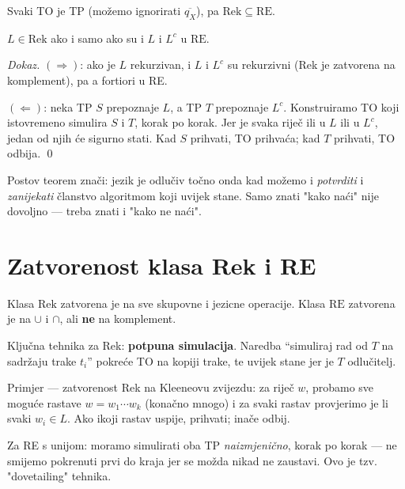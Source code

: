 Svaki TO je TP (možemo ignorirati $\overline{q_X}$), pa $\mathrm{Rek} \subseteq \mathrm{RE}$.

\begin{propozicija}
$L \in \mathrm{Rek}$ ako i samo ako su i $L$ i $L^c$ u $\mathrm{RE}$.
\end{propozicija}

\textit{Dokaz.}
$(\Rightarrow)$: ako je $L$ rekurzivan, i $L$ i $L^c$ su rekurzivni
(Rek je zatvorena na komplement), pa a fortiori u RE.

$(\Leftarrow)$: neka TP $S$ prepoznaje $L$, a TP $T$ prepoznaje $L^c$.
Konstruiramo TO koji istovremeno simulira $S$ i $T$, korak po korak.
Jer je svaka riječ ili u $L$ ili u $L^c$, jedan od njih će sigurno stati.
Kad $S$ prihvati, TO prihvaća; kad $T$ prihvati, TO odbija. \qed

\begin{kljucno}
Postov teorem znači: jezik je odlučiv točno onda kad možemo i
\emph{potvrditi} i \emph{zanijekati} članstvo algoritmom koji uvijek stane.
Samo znati "kako naći" nije dovoljno --- treba znati i "kako ne naći".
\end{kljucno}

\section{Zatvorenost klasa Rek i RE}

\begin{propozicija}
Klasa $\mathrm{Rek}$ zatvorena je na sve skupovne i jezicne operacije.
Klasa $\mathrm{RE}$ zatvorena je na $\cup$ i $\cap$, ali \textbf{ne} na komplement.
\end{propozicija}

Ključna tehnika za Rek: \textbf{potpuna simulacija}. Naredba
``simuliraj rad od $T$ na sadržaju trake $t_i$'' pokreće TO na
kopiji trake, te uvijek stane jer je $T$ odlučitelj.

Primjer --- zatvorenost Rek na Kleeneovu zvijezdu:
za riječ $w$, probamo sve moguće rastave $w = w_1 \cdots w_k$ (konačno
mnogo) i za svaki rastav provjerimo je li svaki $w_i \in L$. Ako ikoji
rastav uspije, prihvati; inače odbij.

Za RE s unijom: moramo simulirati oba TP \emph{naizmjenično}, korak
po korak --- ne smijemo pokrenuti prvi do kraja jer se možda nikad
ne zaustavi. Ovo je tzv.\\ "dovetailing" tehnika.

